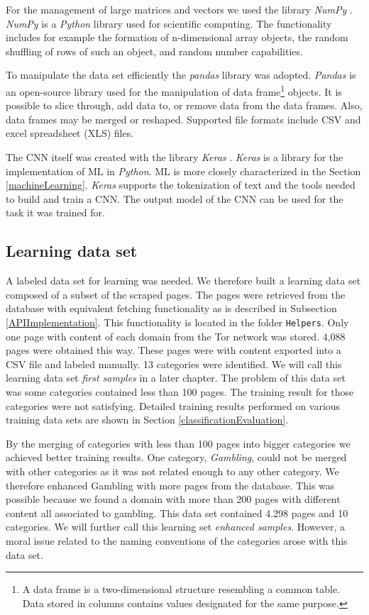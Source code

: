 For the management of large matrices and vectors we used the library \textit{NumPy} \cite{numpy}. \textit{NumPy} is a \textit{Python} library used for scientific computing. The functionality includes for example the formation of n-dimensional array objects, the random shuffling of rows of such an object, and random number capabilities. 

To manipulate the data set efficiently the \textit{pandas} library \cite{pandas} was adopted. \textit{Pandas} is an open-source library used for the manipulation of data frame\footnote{A data frame is a two-dimensional structure resembling a common table. Data stored in columns contains values designated for the same purpose. } objects. It is possible to slice through, add data to, or remove data from the data frames. Also, data frames may be merged or reshaped. Supported file formats include CSV and excel spreadsheet (XLS) files.

The CNN itself was created with the library \textit{Keras} \cite{keras}. \textit{Keras} is a library for the implementation of ML in \textit{Python}. ML is more closely characterized in the Section \ref{machineLearning}. \textit{Keras} supports the tokenization of text and the tools needed to build and train a CNN. The output model of the CNN can be used for the task it was trained for.

\subsection{Learning data set} \label{LearningDatasetImplementation}
A labeled data set for learning was needed. We therefore built a learning data set composed of a subset of the scraped pages. The pages were retrieved from the database with equivalent fetching functionality as is described in Subsection \ref{APIImplementation}. This functionality is located in the folder \texttt{Helpers}. Only one page with content of each domain from the Tor network was stored. 4,088 pages were obtained this way. These pages were with content exported into a CSV file and labeled manually. 13 categories were identified. We will call this learning data set \textit{first samples} in a later chapter. The problem of this data set was some categories contained less than 100 pages. The training result for those categories were not satisfying. Detailed training results performed on various training data sets are shown in Section \ref{classificationEvaluation}. 

By the merging of categories with less than 100 pages into bigger categories we achieved better training results. One category, \textit{Gambling}, could not be merged with other categories as it was not related enough to any other category. We therefore enhanced Gambling with more pages from the database. This was possible because we found a domain with more than 200 pages with different content all associated to gambling. This data set contained 4.298 pages and 10 categories. We will further call this learning set \textit{enhanced samples}. However, a moral issue related to the naming conventions of the categories arose with this data set. 

